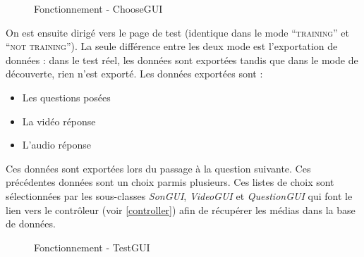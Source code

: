 \newpage

\begin{figure}[!ht]
\begin{center}
  \caption{Fonctionnement - ChooseGUI}
  \label{ChooseGUI} 
\end{center}
\end{figure}

On est ensuite dirigé vers le page de test (identique dans le mode ``\textsc{training}'' et ``\textsc{not training}''). La seule différence entre les deux mode est l'exportation de données : dans le test réel, les données sont exportées tandis que dans le mode de découverte, rien n'est exporté.
Les données exportées sont :
\begin{itemize}
 \item Les questions posées
 \item La vidéo réponse
 \item L'audio réponse
\end{itemize}
Ces données sont exportées lors du passage à la question suivante.
Ces précédentes données sont un choix parmis plusieurs. Ces listes de choix sont sélectionnées par les sous-classes \textit{SonGUI}, \textit{VideoGUI} et \textit{QuestionGUI} qui font le lien vers le contrôleur (voir \ref{controller}) afin de récupérer les médias dans la base de données.

\begin{figure}[!ht]
\begin{center}
  \caption{Fonctionnement - TestGUI}
  \label{TestGUI}
\end{center}
\end{figure}

